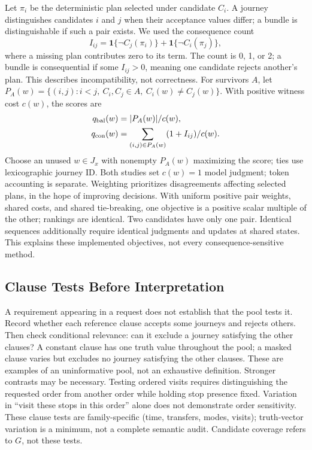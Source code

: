 \documentclass[a4paper,twoside]{article}
\begin{document}
Let $\pi_i$ be the deterministic plan selected under candidate $C_i$. A journey distinguishes candidates $i$ and $j$ when their acceptance values differ; a bundle is distinguishable if such a pair exists. We used the consequence count
\begin{equation}
 I_{ij}=\mathbf{1}\{\neg C_j(\pi_i)\}
       +\mathbf{1}\{\neg C_i(\pi_j)\},
\end{equation}
where a missing plan contributes zero to its term. The count is 0, 1, or 2; a bundle is consequential if some $I_{ij}>0$, meaning one candidate rejects another's plan. This describes incompatibility, not correctness.
For survivors $A$, let $P_A(w)=\{(i,j):i<j,\ C_i,C_j\in A,\ C_i(w)\ne C_j(w)\}$. With positive witness cost $c(w)$, the scores are
\begin{equation}
\begin{split}
q_{\rm bal}(w)&=|P_A(w)|/c(w),\\
q_{\rm con}(w)&=\sum_{(i,j)\in P_A(w)}(1+I_{ij})/c(w).
\end{split}
\end{equation}
Choose an unused $w\in J_x$ with nonempty $P_A(w)$ maximizing the score; ties use lexicographic journey ID. Both studies set $c(w)=1$ model judgment; token accounting is separate. Weighting prioritizes disagreements affecting selected plans, in the hope of improving decisions. With uniform positive pair weights, shared costs, and shared tie-breaking, one objective is a positive scalar multiple of the other; rankings are identical. Two candidates have only one pair. Identical sequences additionally require identical judgments and updates at shared states. This explains these implemented objectives, not every consequence-sensitive method.



\subsection{Clause Tests Before Interpretation}

A requirement appearing in a request does not establish that the pool tests it. Record whether each reference clause accepts some journeys and rejects others. Then check conditional relevance: can it exclude a journey satisfying the other clauses? A constant clause has one truth value throughout the pool; a masked clause varies but excludes no journey satisfying the other clauses. These are examples of an uninformative pool, not an exhaustive definition.
Stronger contrasts may be necessary. Testing ordered visits requires distinguishing the requested order from another order while holding stop presence fixed. Variation in ``visit these stops in this order'' alone does not demonstrate order sensitivity. These clause tests are family-specific (time, transfers, modes, visits); truth-vector variation is a minimum, not a complete semantic audit. Candidate coverage refers to $G$, not these tests.
\end{document}
